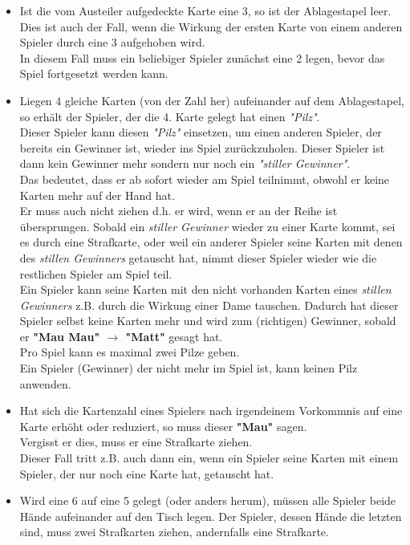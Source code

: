 \documentclass{article}
\begin{document}
\begin{itemize} 
\item Ist die vom Austeiler aufgedeckte Karte eine 3, so ist der Ablagestapel leer. \\ Dies ist auch der Fall, wenn die Wirkung der ersten Karte von einem anderen Spieler durch eine 3 aufgehoben wird. \\ In diesem Fall muss ein beliebiger Spieler zunächst eine 2 legen, bevor das Spiel fortgesetzt werden kann.

\item Liegen 4 gleiche Karten (von der Zahl her) aufeinander auf dem Ablagestapel, so erhält der Spieler,  der die 4. Karte gelegt hat einen \textit{"Pilz"}. \\  Dieser Spieler kann diesen \textit{"Pilz"} einsetzen, um einen anderen Spieler, der bereits ein Gewinner ist, wieder ins Spiel zurückzuholen. Dieser Spieler ist dann kein Gewinner mehr sondern nur noch ein \textit{"stiller Gewinner"}. \\ Das bedeutet, dass er ab sofort wieder am Spiel teilnimmt, obwohl er keine Karten mehr auf der Hand hat. \\ Er muss auch nicht ziehen d.h. er wird, wenn er an der Reihe ist übersprungen. Sobald ein \textit{stiller Gewinner} wieder zu einer Karte kommt, sei es durch eine Strafkarte, oder weil ein anderer Spieler seine Karten mit denen des \textit{stillen Gewinners} getauscht hat, nimmt dieser Spieler wieder wie die restlichen Spieler am Spiel teil. \\
Ein Spieler kann seine Karten mit den nicht vorhanden Karten eines \textit{stillen Gewinners} z.B. durch die Wirkung einer Dame tauschen. Dadurch hat dieser Spieler selbst keine Karten mehr und wird zum (richtigen) Gewinner, sobald er \textbf{"Mau Mau" $\rightarrow$ "Matt"} gesagt hat. \\
Pro Spiel kann es maximal zwei Pilze geben. \\
Ein Spieler (Gewinner) der nicht mehr im Spiel ist,
kann keinen Pilz anwenden.
         
         
\item Hat sich die Kartenzahl eines Spielers nach irgendeinem Vorkommnis auf eine Karte erhöht oder reduziert, so muss dieser \textbf{"Mau"} sagen. \\ Vergisst er dies, muss er eine Strafkarte ziehen. \\ Dieser Fall tritt z.B. auch dann ein, wenn ein Spieler seine Karten mit einem Spieler, der nur noch eine Karte hat, getauscht hat.

\item Wird eine 6 auf eine 5 gelegt (oder anders herum), müssen alle Spieler beide Hände aufeinander auf den Tisch legen. Der Spieler, dessen Hände die letzten sind, muss zwei Strafkarten ziehen, andernfalls eine Strafkarte.

\end{itemize}
\end{document}

